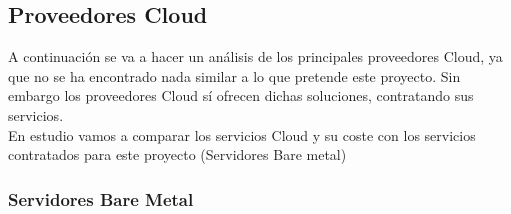 	\subsection{Proveedores Cloud}
		\begin{text}
			A continuación se va a hacer un análisis de los principales proveedores Cloud, ya que no se ha encontrado nada similar a lo que pretende este proyecto. Sin embargo los proveedores Cloud sí ofrecen dichas soluciones, contratando sus servicios. \\
			En estudio vamos a comparar los servicios Cloud y su coste con los servicios contratados para este proyecto (Servidores Bare metal) \\
		\end{text}
	
		\subsubsection{Servidores Bare Metal}
			\label{servidores_bare_metal}

